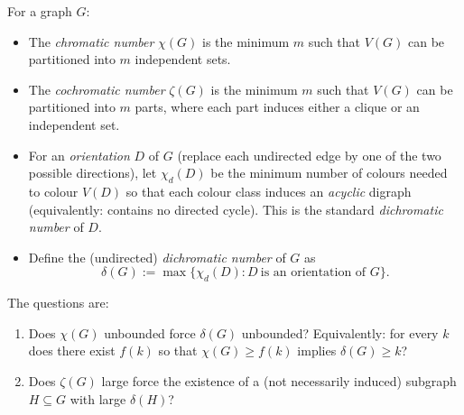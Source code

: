 For a graph $G$:
\begin{itemize}
\item The \emph{chromatic number} $\chi(G)$ is the minimum $m$ such that $V(G)$ can be partitioned into $m$ independent sets.
\item The \emph{cochromatic number} $\zeta(G)$ is the minimum $m$ such that $V(G)$ can be partitioned into $m$ parts,
where each part induces either a clique or an independent set.
\item For an \emph{orientation} $D$ of $G$ (replace each undirected edge by one of the two possible directions),
let $\chi_d(D)$ be the minimum number of colours needed to colour $V(D)$ so that each colour class induces an
\emph{acyclic} digraph (equivalently: contains no directed cycle). This is the standard \emph{dichromatic number} of $D$.
\item Define the (undirected) \emph{dichromatic number} of $G$ as
\[
\delta(G):=\max\{\chi_d(D): D\ \text{is an orientation of }G\}.
\]
\end{itemize}

The questions are:
\begin{enumerate}
\item[(Q1)] Does $\chi(G)$ unbounded force $\delta(G)$ unbounded? Equivalently: for every $k$ does there exist $f(k)$
so that $\chi(G)\ge f(k)$ implies $\delta(G)\ge k$?
\item[(Q2)] Does $\zeta(G)$ large force the existence of a (not necessarily induced) subgraph $H\subseteq G$ with large $\delta(H)$?
\end{enumerate}
